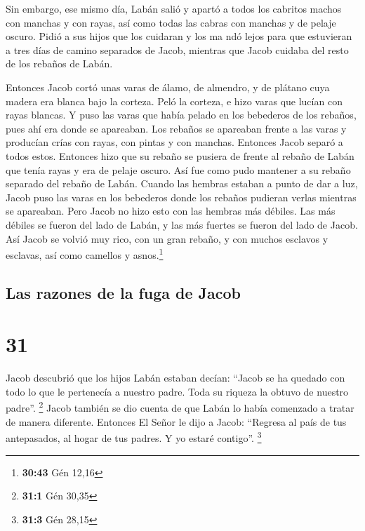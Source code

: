  Sin embargo, ese mismo día, Labán salió y apartó a todos
los cabritos machos con manchas y con rayas, así como todas las cabras
con manchas y de pelaje oscuro. Pidió a sus hijos que los cuidaran y los
ma ndó lejos  para que estuvieran a tres días de camino
separados de Jacob, mientras que Jacob cuidaba del resto de los rebaños
de Labán.

 Entonces Jacob cortó unas varas de álamo, de almendro, y
de plátano cuya madera era blanca bajo la corteza. Peló la corteza, e
hizo varas que lucían con rayas blancas.  Y puso las
varas que había pelado en los bebederos de los rebaños, pues ahí era
donde se apareaban.  Los rebaños se apareaban frente a
las varas y producían crías con rayas, con pintas y con manchas.
 Entonces Jacob separó a todos estos. Entonces hizo que
su rebaño se pusiera de frente al rebaño de Labán que tenía rayas y era
de pelaje oscuro. Así fue como pudo mantener a su rebaño separado del
rebaño de Labán.  Cuando las hembras estaban a punto de
dar a luz, Jacob puso las varas en los bebederos donde los rebaños
pudieran verlas mientras se apareaban.  Pero Jacob no
hizo esto con las hembras más débiles. Las más débiles se fueron del
lado de Labán, y las más fuertes se fueron del lado de Jacob.
 Así Jacob se volvió muy rico, con un gran rebaño, y con
muchos esclavos y esclavas, así como camellos y asnos.\footnote{\textbf{30:43}
  Gén 12,16}

\hypertarget{las-razones-de-la-fuga-de-jacob}{%
\subsection{Las razones de la fuga de
Jacob}\label{las-razones-de-la-fuga-de-jacob}}

\hypertarget{section-30}{%
\section{31}\label{section-30}}

 Jacob descubrió que los hijos Labán estaban decían:
``Jacob se ha quedado con todo lo que le pertenecía a nuestro padre.
Toda su riqueza la obtuvo de nuestro padre''. \footnote{\textbf{31:1}
  Gén 30,35}  Jacob también se dio cuenta de que Labán lo
había comenzado a tratar de manera diferente.  Entonces El
Señor le dijo a Jacob: ``Regresa al país de tus antepasados, al hogar de
tus padres. Y yo estaré contigo''. \footnote{\textbf{31:3} Gén 28,15}

